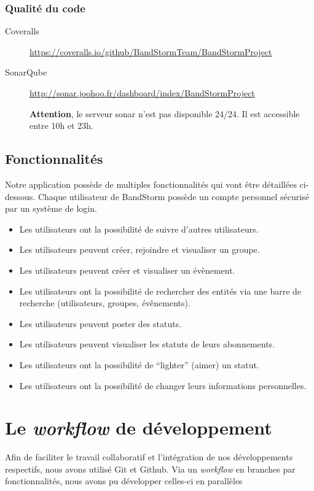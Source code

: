 \documentclass[12pt,a4paper,oneside]{book}
\begin{document}
	\subsection{Qualité du code}
	\begin{description}
		\item[Coveralls] \url{https://coveralls.io/github/BandStormTeam/BandStormProject}
		\item[SonarQube] \url{http://sonar.joohoo.fr/dashboard/index/BandStormProject}~\\
			\begin{attention}
				\textbf{Attention}, le serveur sonar n'est pas disponible 24/24. Il est accessible entre 10h et 23h.
			\end{attention}
	\end{description}


	\section{Fonctionnalités}
	Notre application possède de multiples fonctionnalités qui vont être détaillées ci-dessous.
	Chaque utilisateur de BandStorm possède un compte personnel sécurisé par un système de login.
	
	\begin{itemize}
		\item Les utilisateurs ont la possibilité de suivre d’autres utilisateurs.
		\item Les utilisateurs peuvent créer, rejoindre et visualiser un groupe.
		\item Les utilisateurs peuvent créer et visualiser un évènement.
		\item Les utilisateurs ont la possibilité de rechercher des entités via une barre de recherche (utilisateurs, groupes, évênements).
		\item Les utilisateurs peuvent poster des statuts.
		\item Les utilisateurs peuvent visualiser les statuts de leurs abonnements.
		\item Les utilisateurs ont la possibilité de “lighter” (aimer) un statut.
		\item Les utilisateurs ont la possibilité de changer leurs informations personnelles.
	\end{itemize}	
	
	\chapter{Le \textit{workflow} de développement}
	Afin de faciliter le travail collaboratif et l'intégration de nos développements respectifs, nous avons utilisé Git et Github. 
	Via un \textit{workflow} en branches par fonctionnalités, nous avons pu développer celles-ci en parallèles 
	
\end{document}
